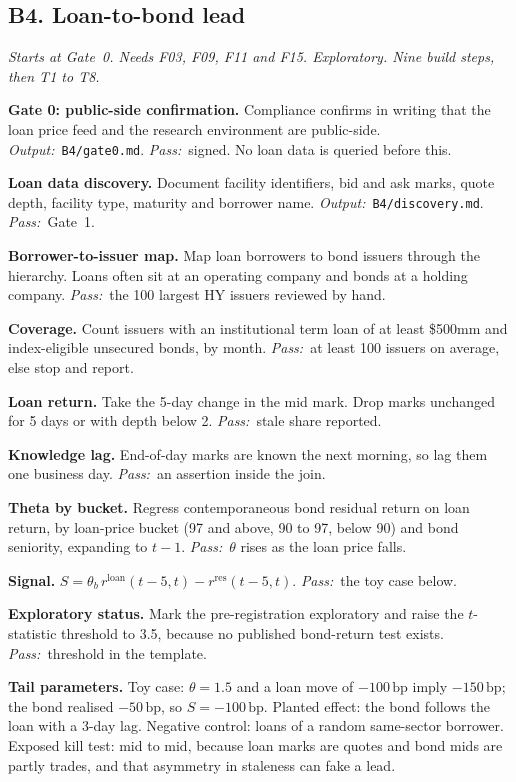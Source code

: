 \documentclass[11pt,letterpaper]{article}
\makeatletter
\newcommand{\code}[1]{\texttt{#1}}
\newcommand{\bp}{\,\mathrm{bp}}
\newcommand{\rres}{r^{\mathrm{res}}}      %
\newcommand*{\twodigit}[1]{\expandafter\@twodigit\csname c@#1\endcsname}
\newcommand*{\@twodigit}[1]{\ifnum#1<10 0\fi\number#1}
\newcommand{\stepname}[1]{\textbf{#1.}}
\newcommand{\Out}{\textit{Output:}~}
\newcommand{\Pass}{\textit{Pass:}~}
\makeatother
\begin{document}
\subsection{B4. Loan-to-bond lead}
\emph{Starts at Gate~0. Needs F03, F09, F11 and F15. Exploratory. Nine build steps, then T1 to T8.}
\begin{ladder}[label=\textbf{B4.\twodigit*}]
\item \stepname{Gate 0: public-side confirmation} Compliance confirms in writing that the loan price feed and the research environment are public-side. \Out \code{B4/gate0.md}. \Pass signed. No loan data is queried before this.
\item \stepname{Loan data discovery} Document facility identifiers, bid and ask marks, quote depth, facility type, maturity and borrower name. \Out \code{B4/discovery.md}. \Pass Gate~1.
\item \stepname{Borrower-to-issuer map} Map loan borrowers to bond issuers through the hierarchy. Loans often sit at an operating company and bonds at a holding company. \Pass the 100 largest HY issuers reviewed by hand.
\item \stepname{Coverage} Count issuers with an institutional term loan of at least \$500mm and index-eligible unsecured bonds, by month. \Pass at least 100 issuers on average, else stop and report.
\item \stepname{Loan return} Take the 5-day change in the mid mark. Drop marks unchanged for 5 days or with depth below 2. \Pass stale share reported.
\item \stepname{Knowledge lag} End-of-day marks are known the next morning, so lag them one business day. \Pass an assertion inside the join.
\item \stepname{Theta by bucket} Regress contemporaneous bond residual return on loan return, by loan-price bucket (97 and above, 90 to 97, below 90) and bond seniority, expanding to $t-1$. \Pass $\theta$ rises as the loan price falls.
\item \stepname{Signal} $S=\theta_b\,r^{\mathrm{loan}}(t-5,t)-\rres(t-5,t)$. \Pass the toy case below.
\item \stepname{Exploratory status} Mark the pre-registration exploratory and raise the $t$-statistic threshold to 3.5, because no published bond-return test exists. \Pass threshold in the template.
\end{ladder}
\textbf{Tail parameters.} Toy case: $\theta=1.5$ and a loan move of $-100\bp$ imply $-150\bp$; the bond realised $-50\bp$, so $S=-100\bp$. Planted effect: the bond follows the loan with a 3-day lag. Negative control: loans of a random same-sector borrower. Exposed kill test: mid to mid, because loan marks are quotes and bond mids are partly trades, and that asymmetry in staleness can fake a lead.
\end{document}
